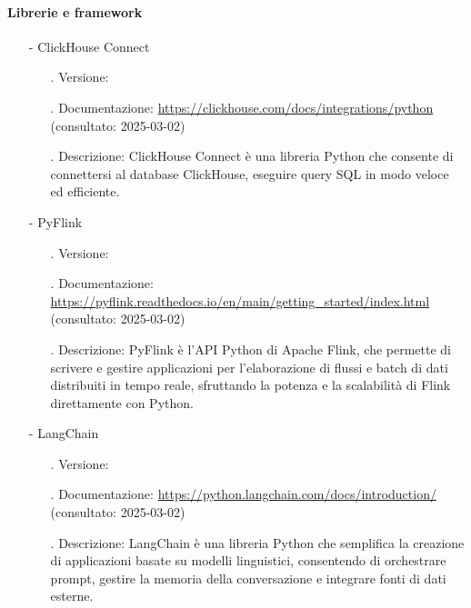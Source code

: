 \documentclass[10pt]{article}
\begin{document}
\begin{justify}
            \paragraph{Librerie e framework}
                \begin{itemize}
                    \item[-] ClickHouse Connect
                        \begin{itemize}
                            \item[.] Versione:
                            \item[.] Documentazione: \url{https://clickhouse.com/docs/integrations/python} (consultato: 2025-03-02)
                            \item[.] Descrizione: ClickHouse Connect è una libreria Python che consente di connettersi al database ClickHouse, eseguire query SQL 
                            in modo veloce ed efficiente.
                        \end{itemize}
                    \item[-] PyFlink
                        \begin{itemize}
                            \item[.] Versione:
                            \item[.] Documentazione: \url{https://pyflink.readthedocs.io/en/main/getting_started/index.html} (consultato: 2025-03-02)
                            \item[.] Descrizione: PyFlink è l’API Python di Apache Flink, che permette di scrivere e gestire applicazioni per l'elaborazione di 
                            flussi e batch di dati distribuiti in tempo reale, sfruttando la potenza e la scalabilità di Flink direttamente con Python.
                        \end{itemize}
                    \item[-] LangChain
                        \begin{itemize}
                            \item[.] Versione:
                            \item[.] Documentazione: \url{https://python.langchain.com/docs/introduction/} (consultato: 2025-03-02)
                            \item[.] Descrizione: LangChain è una libreria Python che semplifica la creazione di applicazioni basate su modelli linguistici, 
                            consentendo di orchestrare prompt, gestire la memoria della conversazione e integrare fonti di dati esterne.

\end{itemize}
\end{itemize}
\end{justify}
\end{document}
